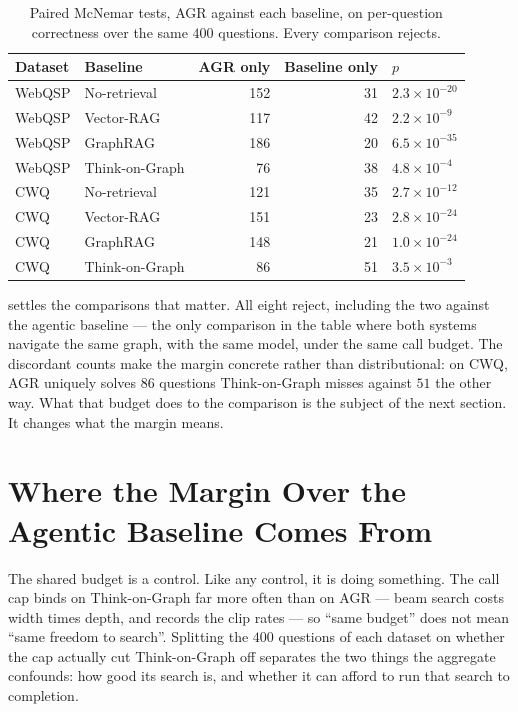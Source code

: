 \begin{table}[!tb]
  \begin{center}
    \caption[Paired McNemar tests against each baseline]{Paired McNemar tests,
    AGR against each baseline, on per-question correctness over the same $400$
    questions. Every comparison rejects.}
    \label{tab:mcnemar}
    \small
    \begin{tabular}{|l|l|r|r|l|}
      \hline
      \textbf{Dataset} & \textbf{Baseline} & \textbf{AGR only} &
      \textbf{Baseline only} & \textbf{$p$} \\
      \hline
      WebQSP & No-retrieval   & 152 & 31 & $2.3 \times 10^{-20}$ \\
      WebQSP & Vector-RAG     & 117 & 42 & $2.2 \times 10^{-9}$ \\
      WebQSP & GraphRAG       & 186 & 20 & $6.5 \times 10^{-35}$ \\
      WebQSP & Think-on-Graph &  76 & 38 & $4.8 \times 10^{-4}$ \\
      \hline
      CWQ & No-retrieval   & 121 & 35 & $2.7 \times 10^{-12}$ \\
      CWQ & Vector-RAG     & 151 & 23 & $2.8 \times 10^{-24}$ \\
      CWQ & GraphRAG       & 148 & 21 & $1.0 \times 10^{-24}$ \\
      CWQ & Think-on-Graph &  86 & 51 & $3.5 \times 10^{-3}$ \\
      \hline
    \end{tabular}
  \end{center}
\end{table}

 settles the comparisons that matter. All eight reject,
including the two against the agentic baseline --- the only comparison in the
table where both systems navigate the same graph, with the same model, under the
same call budget. The discordant counts make the margin concrete rather than
distributional: on CWQ, AGR uniquely solves $86$ questions Think-on-Graph misses
against $51$ the other way. What that budget does to the comparison is the
subject of the next section. It changes what the margin means.

\section{Where the Margin Over the Agentic Baseline Comes
From}\label{sec:tog-split}

The shared budget is a control. Like any control, it is doing something.
The call cap binds on Think-on-Graph far more often than
on AGR --- beam search costs width times depth, and 
records the clip rates --- so ``same budget'' does not mean ``same freedom to
search''. Splitting the $400$ questions of each dataset on whether the cap
actually cut Think-on-Graph off separates the two things the aggregate
confounds: how good its search is, and whether it can afford to run that search
to completion.

